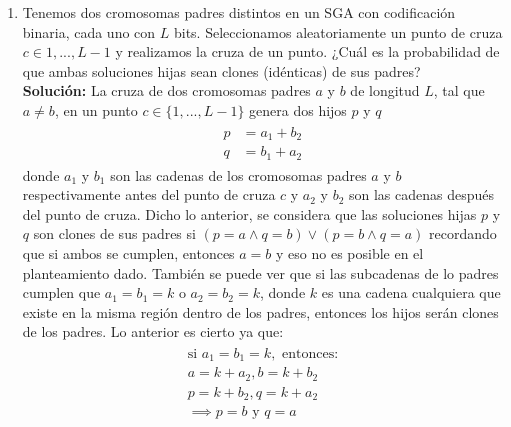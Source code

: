 \documentclass[10pt,letterpaper]{article}
\begin{document}
\begin{enumerate}
    \item Tenemos dos cromosomas padres distintos en un SGA con codificación binaria,
          cada uno con $L$ bits. Seleccionamos aleatoriamente un punto de cruza
          $c \in {1,...,L-1}$ y realizamos la cruza de un punto. ¿Cuál es la probabilidad
          de que ambas soluciones hijas sean clones (idénticas) de sus padres?\\[\baselineskip]
        \textbf{Solución:} La cruza de dos cromosomas padres $a$ y $b$ de longitud $L$,
        tal que $a\neq b$, en un punto $c \in \{1, ..., L-1\}$ genera dos hijos $p$ y $q$ \\
            \begin{equation*}\begin{split} \begin{aligned}
                p &= a_1 + b_2 \\
                q &= b_1 + a_2
            \end{aligned} \end{split} \end{equation*}
        donde $a_1$ y $b_1$ son las cadenas de los cromosomas padres $a$ y $b$
        respectivamente antes del punto de cruza $c$ y $a_2$ y $b_2$ son las cadenas después del
        punto de cruza. Dicho lo anterior, se considera que las soluciones hijas $p$ y $q$ son clones de sus
        padres si $(p=a \land q=b) \lor (p=b \land q=a)$ recordando que si ambos
        se cumplen, entonces $a=b$ y eso no es posible en el planteamiento dado. También
        se puede ver que si las subcadenas de lo padres cumplen que $a_1 = b_1 = k$ o $a_2 = b_2 = k$,
        donde $k$ es una cadena cualquiera que existe en la misma región dentro de los padres, entonces
        los hijos serán clones de los padres. Lo anterior es cierto ya que:
            \begin{equation*}\begin{split} \begin{gathered}
                \text{si } a_1 = b_1 = k, \text{ entonces:} \\
                a = k + a_2,
                b = k + b_2\\
                p = k + b_2,
                q = k + a_2\\
                \implies p = b \text{ y } q = a \\
            \end{gathered} \end{split} \end{equation*}

\end{enumerate}
\end{document}
